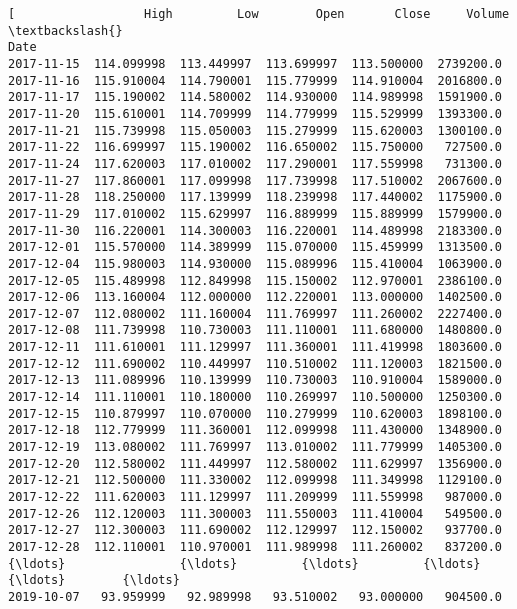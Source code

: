 \documentclass[11pt]{article}
\begin{document}
    \begin{Verbatim}[commandchars=\\\{\}]
[                  High         Low        Open       Close     Volume  \textbackslash{}
Date                                                                    
2017-11-15  114.099998  113.449997  113.699997  113.500000  2739200.0   
2017-11-16  115.910004  114.790001  115.779999  114.910004  2016800.0   
2017-11-17  115.190002  114.580002  114.930000  114.989998  1591900.0   
2017-11-20  115.610001  114.709999  114.779999  115.529999  1393300.0   
2017-11-21  115.739998  115.050003  115.279999  115.620003  1300100.0   
2017-11-22  116.699997  115.190002  116.650002  115.750000   727500.0   
2017-11-24  117.620003  117.010002  117.290001  117.559998   731300.0   
2017-11-27  117.860001  117.099998  117.739998  117.510002  2067600.0   
2017-11-28  118.250000  117.139999  118.239998  117.440002  1175900.0   
2017-11-29  117.010002  115.629997  116.889999  115.889999  1579900.0   
2017-11-30  116.220001  114.300003  116.220001  114.489998  2183300.0   
2017-12-01  115.570000  114.389999  115.070000  115.459999  1313500.0   
2017-12-04  115.980003  114.930000  115.089996  115.410004  1063900.0   
2017-12-05  115.489998  112.849998  115.150002  112.970001  2386100.0   
2017-12-06  113.160004  112.000000  112.220001  113.000000  1402500.0   
2017-12-07  112.080002  111.160004  111.769997  111.260002  2227400.0   
2017-12-08  111.739998  110.730003  111.110001  111.680000  1480800.0   
2017-12-11  111.610001  111.129997  111.360001  111.419998  1803600.0   
2017-12-12  111.690002  110.449997  110.510002  111.120003  1821500.0   
2017-12-13  111.089996  110.139999  110.730003  110.910004  1589000.0   
2017-12-14  111.110001  110.180000  110.269997  110.500000  1250300.0   
2017-12-15  110.879997  110.070000  110.279999  110.620003  1898100.0   
2017-12-18  112.779999  111.360001  112.099998  111.430000  1348900.0   
2017-12-19  113.080002  111.769997  113.010002  111.779999  1405300.0   
2017-12-20  112.580002  111.449997  112.580002  111.629997  1356900.0   
2017-12-21  112.500000  111.330002  112.099998  111.349998  1129100.0   
2017-12-22  111.620003  111.129997  111.209999  111.559998   987000.0   
2017-12-26  112.120003  111.300003  111.550003  111.410004   549500.0   
2017-12-27  112.300003  111.690002  112.129997  112.150002   937700.0   
2017-12-28  112.110001  110.970001  111.989998  111.260002   837200.0   
{\ldots}                {\ldots}         {\ldots}         {\ldots}         {\ldots}        {\ldots}   
2019-10-07   93.959999   92.989998   93.510002   93.000000   904500.0   

\end{Verbatim}
\end{document}
